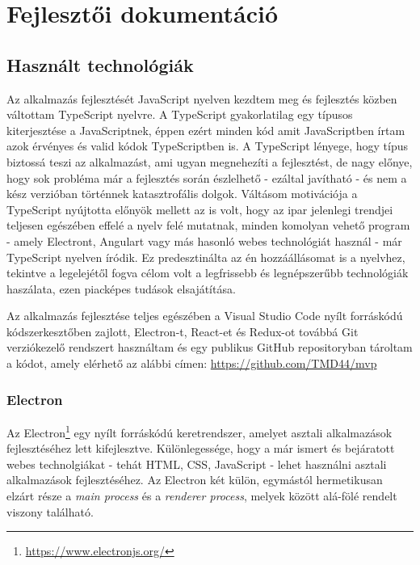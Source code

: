 \chapter{Fejlesztői dokumentáció} %
\label{ch:impl}

\section{Használt technológiák}
Az alkalmazás fejlesztését JavaScript nyelven kezdtem meg és fejlesztés közben váltottam TypeScript nyelvre. A TypeScript gyakorlatilag egy típusos kiterjesztése a JavaScriptnek, éppen ezért minden kód amit JavaScriptben írtam azok érvényes és valid kódok TypeScriptben is. A TypeScript lényege, hogy típus biztossá teszi az alkalmazást, ami ugyan megnehezíti a fejlesztést, de nagy előnye, hogy sok probléma már a fejlesztés során észlelhető - ezáltal javítható - és nem a kész verzióban történnek katasztrofális dolgok. Váltásom motivációja a TypeScript nyújtotta előnyök mellett az is volt, hogy az ipar jelenlegi trendjei teljesen egészében effelé a nyelv felé mutatnak, minden komolyan vehető program - amely Electront, Angulart vagy más hasonló webes technológiát használ - már TypeScript nyelven íródik. Ez predesztinálta az én hozzáállásomat is a nyelvhez, tekintve a legelejétől fogva célom volt a legfrissebb és legnépszerűbb technológiák haszálata, ezen piacképes tudások elsajátítása.

Az alkalmazás fejlesztése teljes egészében a Visual Studio Code nyílt forráskódú kódszerkesztőben zajlott, Electron-t, React-et és Redux-ot továbbá Git verziókezelő rendszert használtam és egy publikus GitHub repositoryban tároltam a kódot, amely elérhető az alábbi címen: \url{https://github.com/TMD44/mvp}

\subsection{Electron}
Az Electron\footnote{\url{https://www.electronjs.org/}} egy nyílt forráskódú keretrendszer, amelyet asztali alkalmazások fejlesztéséhez lett kifejlesztve. Különlegessége, hogy a már ismert és bejáratott webes technolgiákat - tehát HTML, CSS, JavaScript - lehet használni asztali alkalmazások fejlesztéséhez. Az Electron két külön, egymástól hermetikusan elzárt része a {\it main process} és a {\it renderer process}, melyek között alá-fölé rendelt viszony található.

